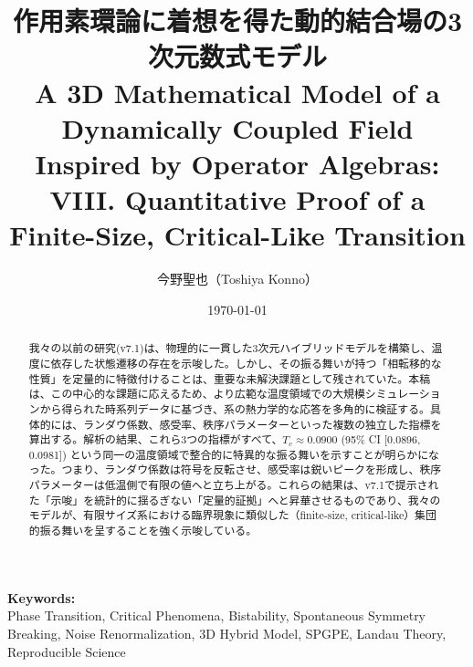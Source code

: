\documentclass[a4paper,11pt,ja=standard,lualatex]{bxjsarticle}
\begin{document}
\title{作用素環論に着想を得た動的結合場の3次元数式モデル\\
\large A 3D Mathematical Model of a Dynamically Coupled Field Inspired by Operator Algebras: VIII. Quantitative Proof of a Finite-Size, Critical-Like Transition}
\author[1]{今野聖也（Toshiya Konno）}
\date{\today}
\maketitle

\noindent\textbf{Keywords:}\\
Phase Transition, Critical Phenomena, Bistability, Spontaneous Symmetry Breaking, Noise Renormalization, 3D Hybrid Model, SPGPE, Landau Theory, Reproducible Science

\begin{abstract}
\noindent
我々の以前の研究(v7.1)は、物理的に一貫した3次元ハイブリッドモデルを構築し、温度に依存した状態遷移の存在を示唆した。しかし、その振る舞いが持つ「相転移的な性質」を定量的に特徴付けることは、重要な未解決課題として残されていた。本稿は、この中心的な課題に応えるため、より広範な温度領域での大規模シミュレーションから得られた時系列データに基づき、系の熱力学的な応答を多角的に検証する。具体的には、ランダウ係数、感受率、秩序パラメーターといった複数の独立した指標を算出する。解析の結果、これら3つの指標がすべて、$T_c \approx 0.0900$ (95\% CI [0.0896, 0.0981]) という同一の温度領域で整合的に特異的な振る舞いを示すことが明らかになった。つまり、ランダウ係数は符号を反転させ、感受率は鋭いピークを形成し、秩序パラメーターは低温側で有限の値へと立ち上がる。これらの結果は、v7.1\!で提示された「示唆」を統計的に揺るぎない「定量的証拠」へと昇華させるものであり、我々のモデルが、有限サイズ系における臨界現象に類似した（finite-size, critical-like）集団的振る舞いを呈することを強く示唆している。
\end{abstract}
\end{document}
